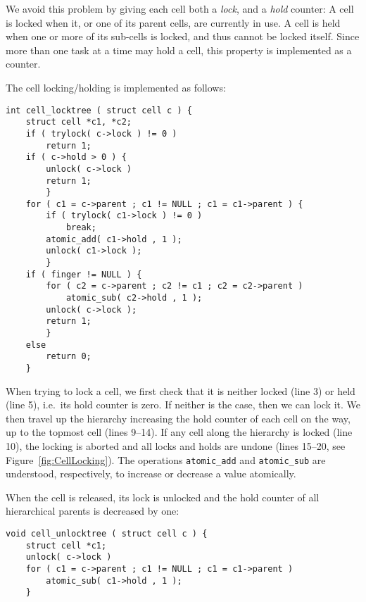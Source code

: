 \documentclass[final]{siamltex}
\newcommand{\fig}[1]
    {Figure~\ref{fig:#1}}
\begin{document}
We avoid this problem by giving each cell both a {\em lock},
and a {\em hold} counter:
A cell is locked when it, or one of its parent cells, are currently
in use. A cell is held when one or more of its sub-cells is locked,
and thus cannot be locked itself.
Since more than one task at a time may hold a cell, this property
is implemented as a counter.

The cell locking/holding is implemented as follows:
        
\begin{center}\begin{minipage}{0.8\textwidth}
    \begin{lstlisting}
int cell_locktree ( struct cell c ) {
    struct cell *c1, *c2;
    if ( trylock( c->lock ) != 0 )
        return 1;
    if ( c->hold > 0 ) {
        unlock( c->lock )
        return 1;
        }
    for ( c1 = c->parent ; c1 != NULL ; c1 = c1->parent ) {
        if ( trylock( c1->lock ) != 0 )
            break;
        atomic_add( c1->hold , 1 );
        unlock( c1->lock );
        }
    if ( finger != NULL ) {
        for ( c2 = c->parent ; c2 != c1 ; c2 = c2->parent )
            atomic_sub( c2->hold , 1 );
        unlock( c->lock );
        return 1;
        }
    else
        return 0;
    }
    \end{lstlisting}
\end{minipage}\end{center}

\noindent When trying to lock a cell, we first check that it is neither
locked (line 3) or held (line 5), i.e.~its hold counter is zero.
If neither is the case, then we can lock it.
We then travel up the hierarchy increasing the 
hold counter of each cell on the way, up to the topmost cell (lines 9--14).
If any cell along the hierarchy is locked (line 10), the locking is aborted
and all locks and holds are undone (lines 15--20, see \fig{CellLocking}).
The operations {\tt atomic\_add} and {\tt atomic\_sub} are understood,
respectively, to increase or decrease a value atomically.

When the cell is released, its lock is unlocked and the hold
counter of all hierarchical parents is decreased by one:

\begin{center}\begin{minipage}{0.8\textwidth}
    \begin{lstlisting}
void cell_unlocktree ( struct cell c ) {
    struct cell *c1;
    unlock( c->lock )
    for ( c1 = c->parent ; c1 != NULL ; c1 = c1->parent )
        atomic_sub( c1->hold , 1 );
    }
    \end{lstlisting}
\end{minipage}\end{center}
\end{document}
